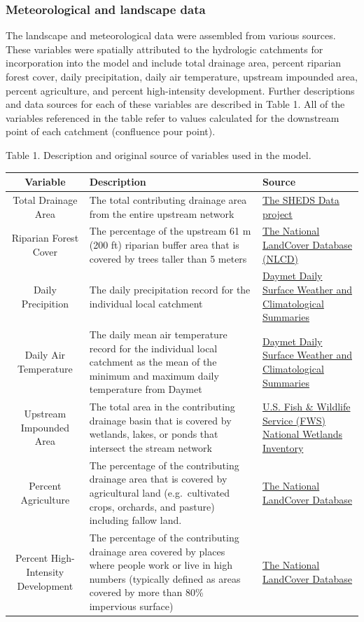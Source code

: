 \documentclass[]{article}
\begin{document}
\subsubsection{Meteorological and landscape
data}\label{meteorological-and-landscape-data}

The landscape and meteorological data were assembled from various
sources. These variables were spatially attributed to the hydrologic
catchments for incorporation into the model and include total drainage
area, percent riparian forest cover, daily precipitation, daily air
temperature, upstream impounded area, percent agriculture, and percent
high-intensity development. Further descriptions and data sources for
each of these variables are described in Table 1. All of the variables
referenced in the table refer to values calculated for the downstream
point of each catchment (confluence pour point).

Table 1. Description and original source of variables used in the model.

\begin{longtable}[c]{@{}cll@{}}
\toprule
Variable & Description & Source\tabularnewline
\midrule
\endhead
Total Drainage Area & The total contributing drainage area from the
entire upstream network &
\href{http://conte-ecology.github.io/shedsData/}{The SHEDS Data
project}\tabularnewline
Riparian Forest Cover & The percentage of the upstream 61 m (200 ft)
riparian buffer area that is covered by trees taller than 5 meters &
\href{http://www.mrlc.gov/nlcd06_data.php}{The National LandCover
Database (NLCD)}\tabularnewline
Daily Precipition & The daily precipitation record for the individual
local catchment & \href{https://daymet.ornl.gov/}{Daymet Daily Surface
Weather and Climatological Summaries}\tabularnewline
Daily Air Temperature & The daily mean air temperature record for the
individual local catchment as the mean of the minimum and maximum daily
temperature from Daymet & \href{https://daymet.ornl.gov/}{Daymet Daily
Surface Weather and Climatological Summaries}\tabularnewline
Upstream Impounded Area & The total area in the contributing drainage
basin that is covered by wetlands, lakes, or ponds that intersect the
stream network &
\href{http://www.fws.gov/wetlands/Data/Data-Download.html}{U.S. Fish \&
Wildlife Service (FWS) National Wetlands Inventory}\tabularnewline
Percent Agriculture & The percentage of the contributing drainage area
that is covered by agricultural land (e.g.~cultivated crops, orchards,
and pasture) including fallow land. &
\href{http://www.mrlc.gov/nlcd06_data.php}{The National LandCover
Database}\tabularnewline
Percent High-Intensity Development & The percentage of the contributing
drainage area covered by places where people work or live in high
numbers (typically defined as areas covered by more than 80\% impervious
surface) & \href{http://www.mrlc.gov/nlcd06_data.php}{The National
LandCover Database}\tabularnewline
\bottomrule
\end{longtable}
\end{document}
